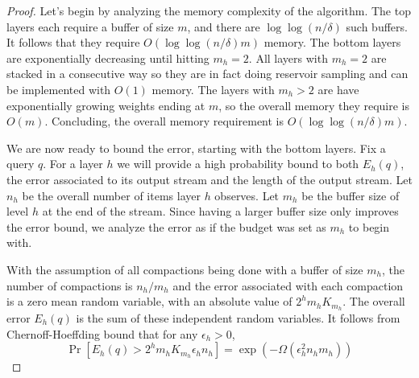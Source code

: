 \documentclass[anon,12pt]{colt2019} %
\newcommand{\eps}{\epsilon}
\renewcommand{\Pr}{\operatorname{Pr}}
\begin{document}
{\begin{proof}
Let's begin by analyzing the memory complexity of the algorithm. The top layers each require a buffer of size $m$, and there are $\log\log(n/\delta)$ such buffers. It follows that they require $O(\log\log(n/\delta)m)$ memory. The bottom layers are exponentially decreasing until hitting $m_h=2$. All layers with $m_h=2$ are stacked in a consecutive way so they are in fact doing reservoir sampling and can be implemented with $O(1)$ memory. The layers with $m_h>2$ are have exponentially growing weights ending at $m$, so the overall memory they require is $O(m)$. Concluding, the overall memory requirement is $O(\log\log(n/\delta)m)$.

We are now ready to bound the error, starting with the bottom layers. Fix a query $q$. For a layer $h$ we will provide a high probability bound to both $E_h(q)$, the error associated to its output stream and the length of the output stream. Let $n_h$ be the overall number of items layer $h$ observes. Let $m_h$ be the buffer size of level $h$ at the end of the stream. Since having a larger buffer size only improves the error bound, we analyze the error as if the budget was set as $m_h$ to begin with.

With the assumption of all compactions being done with a buffer of size $m_h$, the number of compactions is $n_h/m_h$ and the error associated with each compaction is a zero mean random variable, with an absolute value of $2^h m_h K_{m_h}$. The overall error $E_h(q)$ is the sum of these independent random variables. It follows from Chernoff-Hoeffding bound that for any $\eps_h > 0$,
\begin{equation} \label{eq:err low1}
\Pr\left[ E_h(q) > 2^h m_h K_{m_h} \eps_h n_h \right] = \exp \left( -\Omega\left( \eps_h^2 n_h m_h \right) \right)
\end{equation}


\end{proof}}
\end{document}
